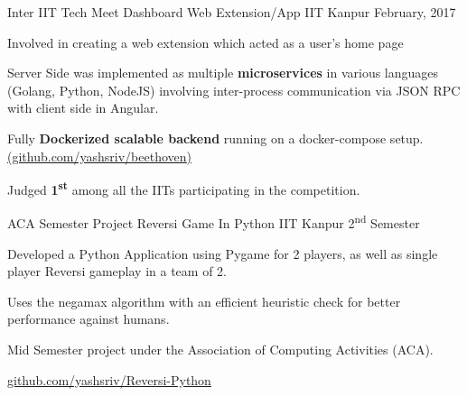

\begin{cventries}

  \cventry
  {Inter IIT Tech Meet} %
  {Dashboard Web Extension/App} %
  {IIT Kanpur} %
  {February, 2017} %
  {
    \begin{cvitems} %
    \item {Involved in creating a web extension which acted as a user’s home page}
    \item {Server Side was implemented as multiple \textbf{microservices} in
    various languages (Golang, Python, NodeJS) involving inter-process
    communication via JSON RPC with client side in Angular.}
    \item {Fully \textbf{Dockerized scalable backend} running on a docker-compose
    setup. \href{https://github.com/yashsriv/beethoven}{(github.com/yashsriv/beethoven)}}
    \item {Judged \textbf{1\textsuperscript{st}} among all the IITs participating
    in the competition.} 
    \end{cvitems}
  } 
  
  \cventry
  {ACA Semester Project} %
  {Reversi Game In Python} %
  {IIT Kanpur} %
  {2\textsuperscript{nd} Semester} %
  {
    \begin{cvitems} %
    \item {Developed a Python Application using Pygame for 2 players, as well
        as single player Reversi gameplay in a team of 2.}
    \item {Uses the negamax algorithm with an efficient heuristic check
        for better performance against humans.}
    \item{Mid Semester project under the Association of Computing
        Activities (ACA).}
    \item \href{https://github.com/yashsriv/Reversi-Python}{github.com/yashsriv/Reversi-Python}
    \end{cvitems}
  }


\end{cventries}
